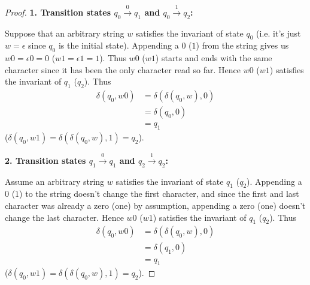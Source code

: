 \begin{proof}
        
        \vspace{5mm}
        
        \textbf{1. Transition states $q_0 \xrightarrow{0} q_1$ and $q_0 \xrightarrow{1} q_2$:}
        
        Suppose that an arbitrary 
        string $w$ satisfies the invariant of state $q_0$ (i.e. it's just 
        $w = \epsilon$ since $q_0$ is the initial state). Appending a $0$ ($1$)
        from the string gives us $w0 = \epsilon 0 = 0$ ($w1 = \epsilon 1 = 1$).
        Thus $w0$ ($w1$) starts and ends with the same character since it 
        has been the only character read so far. Hence $w0$ ($w1$) satisfies
        the invariant of $q_1$ ($q_2$). Thus
        \begin{align*}
            \delta(q_0, w0) &= \delta(\delta(q_0, w), 0) \\
            &= \delta(q_0, 0) \tag{by assumption} \\
            &= q_1
        \end{align*}
        ($\delta(q_0, w1) = \delta(\delta(q_0, w), 1) = q_2$).
        
        \vspace{5mm}
        
        \textbf{2. Transition states $q_1 \xrightarrow{0} q_1$ and $q_2 \xrightarrow{1} q_2$:}
        
        Assume an arbitrary string $w$ satisfies the invariant of state
        $q_1$ ($q_2$). Appending a $0$
        ($1$) to the string doesn't change the first character, and since 
        the first and last character was already a zero (one) by assumption, 
        appending a zero (one) doesn't change the last character.
        Hence $w0$ ($w1$) satisfies the invariant of $q_1$ ($q_2$). 
        Thus 
        \begin{align*}
            \delta(q_0, w0) &= \delta(\delta(q_0, w), 0) \\
            &= \delta(q_1, 0) \tag{by assumption} \\
            &= q_1
        \end{align*}
        ($\delta(q_0, w1) = \delta(\delta(q_0, w), 1) = q_2$).
        

\end{proof}
